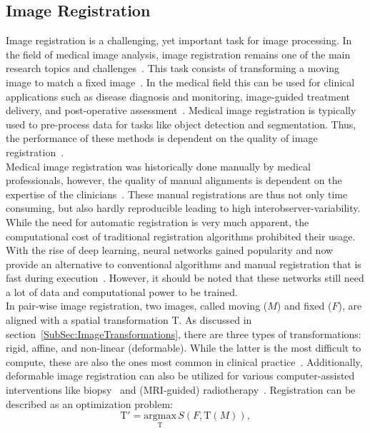\subsection{Image Registration} \label{SubSec:ImageRegistration}
Image registration is a challenging, yet important task for image processing. In the field of medical image analysis, image registration remains one of the main research topics and challenges~\cite{Chen2023}. This task consists of transforming a moving image to match a fixed image~\cite{NiftiReg}. In the medical field this can be used for clinical applications such as disease diagnosis and monitoring, image-guided treatment delivery, and post-operative assessment~\cite{Chen2023}. Medical image registration is typically used to pre-process data for tasks like object detection and segmentation. Thus, the performance of these methods is dependent on the quality of image registration~\cite{Chen2020}. \\
Medical image registration was historically done manually by medical professionals, however, the quality of manual alignments is dependent on the expertise of the clinicians~\cite{Haskins2020}. These manual registrations are thus not only time consuming, but also hardly reproducible leading to high interobserver-variability. While the need for automatic registration is very much apparent, the computational cost of traditional registration algorithms prohibited their usage. With the rise of deep learning, neural networks gained popularity and now provide an alternative to conventional algorithms and manual registration that is fast during execution~\cite{Haskins2020}. However, it should be noted that these networks still need a lot of data and computational power to be trained.\\
In pair-wise image registration, two images, called moving ($M$) and fixed ($F$), are aligned with a spatial transformation T. As discussed in section~\ref{SubSec:ImageTransformations}, there are three types of transformations: rigid, affine, and non-linear (deformable). While the latter is the most difficult to compute, these are also the ones most common in clinical practice~\cite{Zou2022}. Additionally, deformable image registration can also be utilized for various computer-assisted interventions like biopsy~\cite{Tam2016} and (MRI-guided) radiotherapy~\cite{Chen2017, Rigaud2019}. Registration can be described as an optimization problem:
\begin{equation}
	\text{T}' = \underset{\text{T}}{\text{argmax}} \, S(F, \text{T}(M)),
\end{equation}
